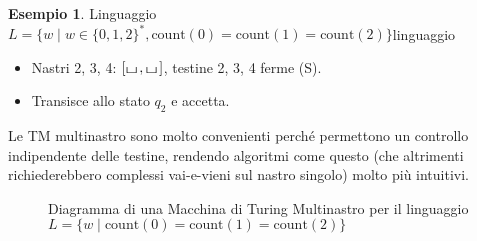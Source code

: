 \documentclass[a4paper]{article}
\theoremstyle{definition} %
\newtheorem{example}{Esempio}
\newcommand{\blankS}{\ensuremath{\raisebox{-0.15ex}{\scalebox{1.3}[0.7]{$\sqcup$}}\mkern2mu}}
\begin{document}
\begin{example}{Linguaggio $L = \{w \mid w \in \{0,1,2\}^*, \text{count}(0)=\text{count}(1)=\text{count}(2)\}$}{linguaggio}
\begin{itemize}
\begin{itemize}
\begin{itemize}
                    \item Nastri 2, 3, 4: $[\blankS, \blankS]$, testine 2, 3, 4 ferme (S).
                    \item Transisce allo stato $q_2$ e accetta.
                \end{itemize}
        \end{itemize}
\end{itemize}
Le TM multinastro sono molto convenienti perché permettono un controllo indipendente delle testine, rendendo algoritmi come questo (che altrimenti richiederebbero complessi vai-e-vieni sul nastro singolo) molto più intuitivi.
\end{example}

\begin{figure}[h!]
    \centering
    \caption{Diagramma di una Macchina di Turing Multinastro per il linguaggio $L=\{w \mid \text{count}(0)=\text{count}(1)=\text{count}(2)\}$}
\end{figure}
\end{document}
